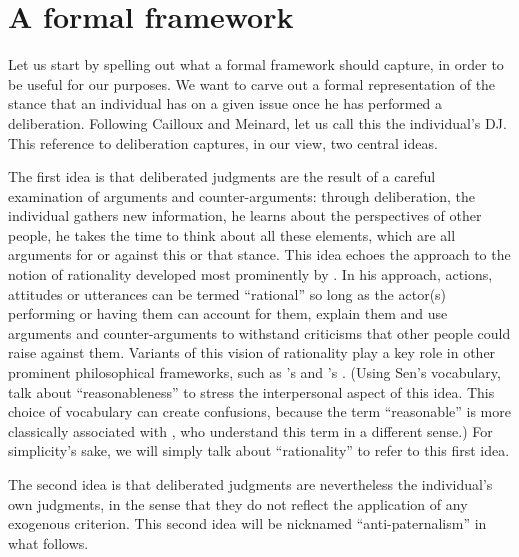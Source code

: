 \documentclass[version=3.21, pagesize, twoside=off, bibliography=totoc, DIV=calc, fontsize=12pt, a4paper, french, english]{scrartcl}
\begin{document}
\section{A formal framework}
Let us start by spelling out what a formal framework should capture, in order to be useful for our purposes. 
We want to carve out a formal representation of the stance that an individual has on a given issue once he has performed a deliberation. 
Following Cailloux and Meinard, let us call this the individual's \ac{DJ}. 
This reference to deliberation captures, in our view, two central ideas.

The first idea is that deliberated judgments are the result of a careful examination of arguments and counter-arguments: through deliberation, the individual gathers new information, he learns about the perspectives of other people, he takes the time to think about all these elements, which are all arguments for or against this or that stance. 
This idea echoes the approach to the notion of rationality developed most prominently by \citet{habermas_theorie_1981}. 
In his approach, actions, attitudes or utterances can be termed “rational” so long as the actor(s) performing or having them can account for them, explain them and use arguments and counter-arguments to withstand criticisms that other people could raise against them. 
Variants of this vision of rationality play a key role in other prominent philosophical frameworks, such as \citeauthor{scanlon_what_2000}’s \citeyearpar{scanlon_what_2000} and \citeauthor{sen_idea_2009}’s \citeyearpar{sen_idea_2009}. 
(Using Sen's vocabulary, \citet{bartkowski_beyond_2018} talk about ``reasonableness'' to stress the interpersonal aspect of this idea. 
This choice of vocabulary can create confusions, because the term ``reasonable'' is more classically associated with \citet{rawls_political_2005}, who understand this term in a different sense.) 
For simplicity's sake, we will simply talk about ``rationality'' to refer to this first idea.

The second idea is that deliberated judgments are nevertheless the individual's own judgments, in the sense that they do not reflect the application of any exogenous criterion. 
This second idea will be nicknamed ``anti-paternalism'' in what follows. 
\end{document}
